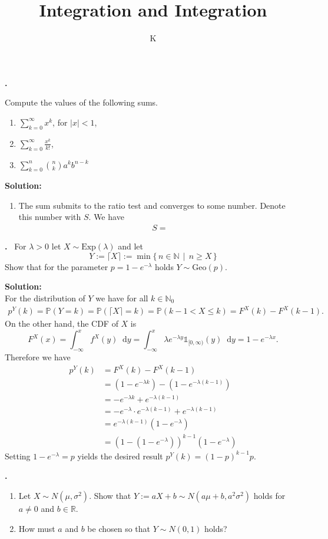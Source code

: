 \documentclass[a4paper]{article}
\title{Integration and Integration}
\author{K}
\theoremstyle{definition}
\newcommand*\diff{\mathop{}\!\mathrm{d}}
\newcounter{problem}
\newcounter{solution}
\newcommand\Problem{%
    \stepcounter{problem}%
    \textbf{\theproblem.}~%
    \setcounter{solution}{0}%
  }
\newcommand\TheSolution{%
    \textbf{Solution:}\\%
  }
\begin{document}
\Problem{
  Compute the values of the following sums.
  \begin{enumerate}
      \item \(\sum_{k=0}^\infty x^k\), for \(|x| < 1\),
      \item \(\sum_{k=0}^\infty \frac{x^k}{k!}\),
      \item \(\sum_{k=0}^n \binom{n}{k} a^k b^{n-k}\)
  \end{enumerate}
}

\TheSolution{
  \begin{enumerate}
      \item The sum submits to the ratio test and converges to some number. Denote this number with \(S\). We have
      \begin{align}
          S = 
      \end{align}
  \end{enumerate}
}

\Problem{
  For \(\lambda > 0\) let \(X \sim \text{Exp}(\lambda)\) and let
  \begin{equation}
    Y := \lceil{X} \rceil := \min \{\, n \in \mathbb{N} \, \mid \, n \geq X \, \}
  \end{equation}
  Show that for the parameter \(p = 1 - e^{-\lambda}\) holds \(Y \sim \text{Geo}(p)\).
}

\TheSolution{
  For the distribution of \(Y\) we have for all \(k \in \mathbb{N}_0\)
  \begin{align}
    p^Y (k) = \mathbb{P}(Y = k) = \mathbb{P}(\lceil{X} \rceil = k) = \mathbb{P}(k - 1 < X \leq k) = F^X (k) - F^X(k - 1) \text{.}
  \end{align}
  On the other hand, the CDF of \(X\) is
  \begin{equation}
    F^X (x) = \int_{-\infty}^x f^X(y) \diff y = \int_{-\infty}^x \lambda e^{-\lambda y} \mathds{1}_{[0, \infty)}(y) \diff y = 1 - e^{-\lambda x} \text{.}
  \end{equation}
  Therefore we have
  \begin{align}
    p^Y (k) &= F^X (k) - F^X(k - 1) \\
    &= (1 - e^{-\lambda k}) - (1 - e^{-\lambda (k - 1)}) \\
    &= - e^{-\lambda k} + e^{-\lambda (k - 1)} \\
    &= - e^{-\lambda} \cdot e^{-\lambda (k - 1)} + e^{-\lambda (k - 1)} \\
    &= e^{-\lambda (k - 1)} (1 - e^{-\lambda}) \\
    &= \left(1 - \left(1 - e^{-\lambda}\right) \right)^{k - 1} (1 - e^{-\lambda})
  \end{align}
  Setting \(1 - e^{-\lambda} = p\) yields the desired result \(p^Y (k) = \left(1-p\right)^{k-1} p\).
}

\Problem{
  \begin{enumerate}
    \item Let \(X \sim N(\mu, \sigma^2)\). Show that \(Y := aX + b \sim N(a \mu + b, a^2 \sigma^2)\) holds for \(a \neq 0\) and \(b \in \mathbb{R}\).
    \item How must \(a\) and \(b\) be chosen so that \(Y \sim N(0, 1)\) holds?
  \end{enumerate}
}
\end{document}
